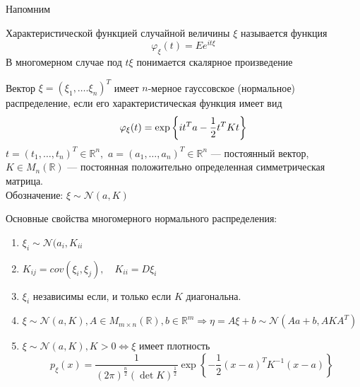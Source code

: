 \documentclass[12pt, russian]{article}
\begin{document}
Напомним
\begin{mydef}
Характеристической функцией случайной величины $\xi$ называется функция 
$$ \varphi_\xi(t) = Ee^{it\xi} $$
В многомерном случае под $t\xi$ понимается скалярное произведение
\end{mydef}

\begin{mydef}
Вектор $\xi = (\xi_1,\ldots.\xi_n)^T$ имеет $n$-мерное гауссовское (нормальное) распределение, если его характеристическая функция имеет вид
$$ \varphi_\xi(t) = \exp{\left\{{it^Ta - \frac{1}{2}t^TKt}\right\}} $$
$ t = (t_1,\ldots,t_n)^T\in\mathbb{R}^n,\,\,a = (a_1,\ldots,a_n)^T\in\mathbb{R}^n$ --- постоянный вектор, $K\in M_n(\mathbb{R})$ --- постоянная положительно определенная симметрическая матрица.\\
Обозначение: $\xi\sim\mathcal{N}(a, K)$
\end{mydef}

Основные свойства многомерного нормального распределения:
\begin{enumerate}
\item $\xi_i \sim \mathcal{N}(a_i, K_{ii}$
\item $K_{ij} = cov(\xi_i,\xi_j),\quad K_{ii} = D\xi_i$
\item $\xi_i$ независимы если, и только если $ K$ диагональна.
\item $\xi\sim\mathcal{N}(a, K), A\in M_{m\times n}(\mathbb{R}), b\in\mathbb{R}^m \Longrightarrow \eta = A\xi+b\sim\mathcal{N}(Aa + b, AKA^T)$
\item $\xi\sim\mathcal{N}(a, K), K > 0 \Longleftrightarrow \xi$ имеет плотность
$$ p_\xi(x) = \frac{1}{(2\pi)^{\frac{n}{2}} (\det{K})^{\frac{1}{2}}}\exp{ \left\{ -\frac{1}{2} (x-a)^T K^{-1}(x-a) \right\} }$$
\end{enumerate}
\end{document}
